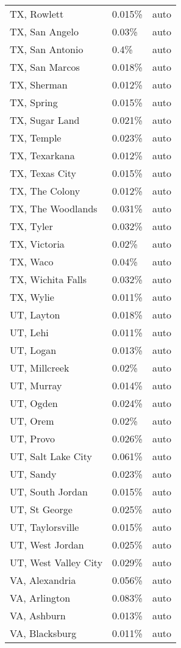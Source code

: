 \begin{longtable}[]{@{}lll@{}}
TX, Rowlett & 0.015\% & auto \\
TX, San Angelo & 0.03\% & auto \\
TX, San Antonio & 0.4\% & auto \\
TX, San Marcos & 0.018\% & auto \\
TX, Sherman & 0.012\% & auto \\
TX, Spring & 0.015\% & auto \\
TX, Sugar Land & 0.021\% & auto \\
TX, Temple & 0.023\% & auto \\
TX, Texarkana & 0.012\% & auto \\
TX, Texas City & 0.015\% & auto \\
TX, The Colony & 0.012\% & auto \\
TX, The Woodlands & 0.031\% & auto \\
TX, Tyler & 0.032\% & auto \\
TX, Victoria & 0.02\% & auto \\
TX, Waco & 0.04\% & auto \\
TX, Wichita Falls & 0.032\% & auto \\
TX, Wylie & 0.011\% & auto \\
UT, Layton & 0.018\% & auto \\
UT, Lehi & 0.011\% & auto \\
UT, Logan & 0.013\% & auto \\
UT, Millcreek & 0.02\% & auto \\
UT, Murray & 0.014\% & auto \\
UT, Ogden & 0.024\% & auto \\
UT, Orem & 0.02\% & auto \\
UT, Provo & 0.026\% & auto \\
UT, Salt Lake City & 0.061\% & auto \\
UT, Sandy & 0.023\% & auto \\
UT, South Jordan & 0.015\% & auto \\
UT, St George & 0.025\% & auto \\
UT, Taylorsville & 0.015\% & auto \\
UT, West Jordan & 0.025\% & auto \\
UT, West Valley City & 0.029\% & auto \\
VA, Alexandria & 0.056\% & auto \\
VA, Arlington & 0.083\% & auto \\
VA, Ashburn & 0.013\% & auto \\
VA, Blacksburg & 0.011\% & auto \\

\end{longtable}
